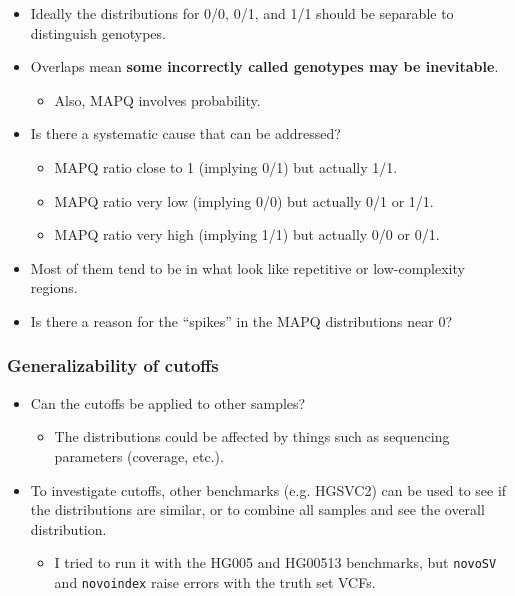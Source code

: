 \documentclass{article}
\begin{document}
\begin{itemize}
\item Ideally the distributions for 0/0, 0/1, and 1/1 should be separable to distinguish genotypes.
\item Overlaps mean \textbf{some incorrectly called genotypes may be inevitable}.\begin{itemize}
\item Also, MAPQ involves probability.
\end{itemize}


\item Is there a systematic cause that can be addressed?\begin{itemize}
\item MAPQ ratio close to 1 (implying 0/1) but actually 1/1.
\item MAPQ ratio very low (implying 0/0) but actually 0/1 or 1/1.
\item MAPQ ratio very high (implying 1/1) but actually 0/0 or 0/1.
\end{itemize}


\item Most of them tend to be in what look like repetitive or low-complexity regions.
\item Is there a reason for the ``spikes'' in the MAPQ distributions near 0?
\end{itemize}

\subsubsection{Generalizability of cutoffs}

\begin{itemize}
\item Can the cutoffs be applied to other samples?\begin{itemize}
\item The distributions could be affected by things such as sequencing parameters (coverage, etc.).
\end{itemize}


\item To investigate cutoffs, other benchmarks (e.g. HGSVC2) can be used to see if the distributions are similar, or to combine all samples and see the overall distribution.\begin{itemize}
\item I tried to run it with the HG005 and HG00513 benchmarks, but \texttt{novoSV} and \texttt{novoindex} raise errors with the truth set VCFs.
\end{itemize}
\end{itemize}
\end{document}
